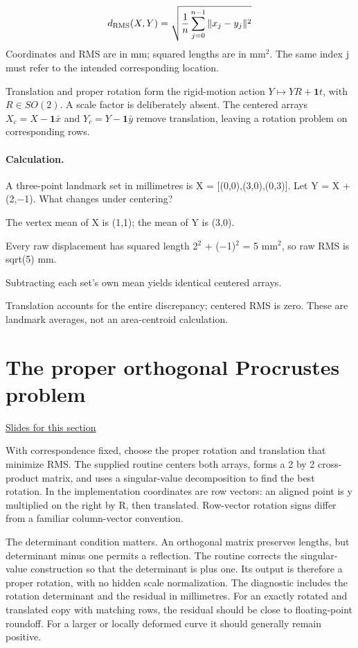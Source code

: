 \documentclass[11pt,letterpaper]{article}
\theoremstyle{definition}\newtheorem{definition}{Definition}\newtheorem{example}{Example}
\numberwithin{equation}{section}
\begin{document}
\[
d_{\rm RMS}(X,Y)=\sqrt{\frac1n\sum_{j=0}^{n-1}\|x_j-y_j\|^2}
\]
Coordinates and RMS are in mm; squared lengths are in mm\ensuremath{^{2}}. The same index j must refer to the intended corresponding location.

Translation and proper rotation form the rigid-motion action $Y\mapsto YR+\boldsymbol1t$, with $R\in SO(2)$. A scale factor is deliberately absent. The centered arrays $X_c=X-\boldsymbol1\bar x$ and $Y_c=Y-\boldsymbol1\bar y$ remove translation, leaving a rotation problem on corresponding rows.

\paragraph{Calculation.} A three-point landmark set in millimetres is X = [(0,0),(3,0),(0,3)]. Let Y = X + (2,\ensuremath{-}1). What changes under centering?

The vertex mean of X is (1,1); the mean of Y is (3,0).

Every raw displacement has squared length 2\ensuremath{^{2}} + (\ensuremath{-}1)\ensuremath{^{2}} = 5 mm\ensuremath{^{2}}, so raw RMS is sqrt(5) mm.

Subtracting each set's own mean yields identical centered arrays.

Translation accounts for the entire discrepancy; centered RMS is zero. These are landmark averages, not an area-centroid calculation.

\section{The proper orthogonal Procrustes problem}
\hypertarget{note-the-proper-orthogonal-procrustes-problem}{}\label{note:the-proper-orthogonal-procrustes-problem}
{\small \href{slides.html\#frame=expand-the-least-squares-objective\&step=1}{Slides for this section}}\par
With correspondence fixed, choose the proper rotation and translation that minimize RMS. The supplied routine centers both arrays, forms a 2 by 2 cross-product matrix, and uses a singular-value decomposition to find the best rotation. In the implementation coordinates are row vectors: an aligned point is y multiplied on the right by R, then translated. Row-vector rotation signs differ from a familiar column-vector convention.

The determinant condition matters. An orthogonal matrix preserves lengths, but determinant minus one permits a reflection. The routine corrects the singular-value construction so that the determinant is plus one. Its output is therefore a proper rotation, with no hidden scale normalization. The diagnostic includes the rotation determinant and the residual in millimetres. For an exactly rotated and translated copy with matching rows, the residual should be close to floating-point roundoff. For a larger or locally deformed curve it should generally remain positive.
\end{document}
